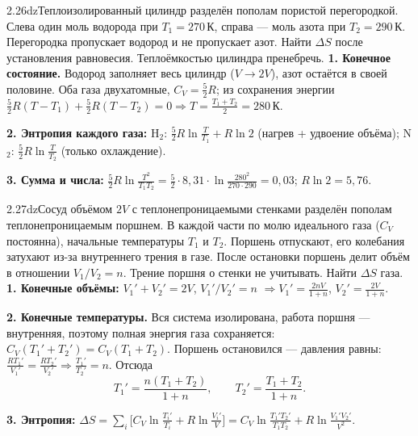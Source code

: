 \begin{problem}{2.26}{dz}{Теплоизолированный цилиндр разделён пополам пористой перегородкой. Слева один моль водорода при $T_1=270$\,К, справа — моль азота при $T_2=290$\,К.
Перегородка пропускает водород и не пропускает азот. Найти $\Delta S$ после установления равновесия. Теплоёмкостью цилиндра пренебречь.}
\textbf{1. Конечное состояние.} Водород заполняет весь цилиндр ($V\to2V$), азот остаётся в своей половине.
Оба газа двухатомные, $C_V=\frac52R$; из сохранения энергии $\frac52R(T-T_1)+\frac52R(T-T_2)=0\Rightarrow T=\frac{T_1+T_2}2=280$\,К.

\textbf{2. Энтропия каждого газа:}
H$_2$: $\frac52R\ln\frac T{T_1}+R\ln2$ (нагрев + удвоение объёма); \;N$_2$: $\frac52R\ln\frac T{T_2}$ (только охлаждение).

\textbf{3. Сумма и числа:} $\frac52R\ln\frac{T^2}{T_1T_2}=\frac52\cdot8{,}31\cdot\ln\frac{280^2}{270\cdot290}=0{,}03$; $R\ln2=5{,}76$.
\end{problem}

\begin{problem}{2.27}{dz}{Сосуд объёмом $2V$ с теплонепроницаемыми стенками разделён пополам теплонепроницаемым поршнем. В каждой части по молю идеального газа
($C_V$ постоянна), начальные температуры $T_1$ и $T_2$. Поршень отпускают, его колебания затухают из-за внутреннего трения в газе.
После остановки поршень делит объём в отношении $V_1/V_2=n$. Трение поршня о стенки не учитывать. Найти $\Delta S$ газа.}
\textbf{1. Конечные объёмы:} $V_1'+V_2'=2V$, $V_1'/V_2'=n$ $\Rightarrow V_1'=\frac{2nV}{1+n}$, $V_2'=\frac{2V}{1+n}$.

\textbf{2. Конечные температуры.} Вся система изолирована, работа поршня — внутренняя, поэтому полная энергия газа сохраняется:
$C_V(T_1'+T_2')=C_V(T_1+T_2)$. Поршень остановился — давления равны: $\frac{RT_1'}{V_1'}=\frac{RT_2'}{V_2'}\Rightarrow\frac{T_1'}{T_2'}=n$. Отсюда
\[T_1'=\frac{n(T_1+T_2)}{1+n},\qquad T_2'=\frac{T_1+T_2}{1+n}.\]

\textbf{3. Энтропия:} $\Delta S=\sum_i\Big[C_V\ln\frac{T_i'}{T_i}+R\ln\frac{V_i'}{V}\Big]=C_V\ln\frac{T_1'T_2'}{T_1T_2}+R\ln\frac{V_1'V_2'}{V^2}$.
\end{problem}

